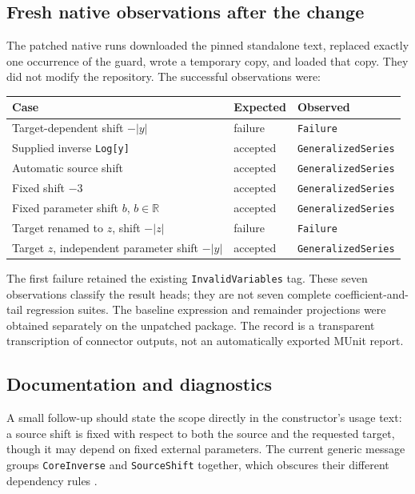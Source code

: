 \documentclass[11pt,letterpaper]{article}
\newcommand{\code}[1]{\texttt{#1}}
\newcommand{\R}{\mathbb R}
\begin{document}
\subsection{Fresh native observations after the change}
The patched native runs downloaded the pinned standalone text, replaced exactly one occurrence of the guard, wrote a temporary copy, and loaded that copy. They did not modify the repository. The successful observations were:
\begin{center}
\begin{tabularx}{\textwidth}{@{}Xll@{}}
\toprule
Case & Expected & Observed\\
\midrule
Target-dependent shift $-\lvert y\rvert$ & failure & \code{Failure}\\
Supplied inverse \code{Log[y]} & accepted & \code{GeneralizedSeries}\\
Automatic source shift & accepted & \code{GeneralizedSeries}\\
Fixed shift $-3$ & accepted & \code{GeneralizedSeries}\\
Fixed parameter shift $b$, $b\in\R$ & accepted & \code{GeneralizedSeries}\\
Target renamed to $z$, shift $-\lvert z\rvert$ & failure & \code{Failure}\\
Target $z$, independent parameter shift $-\lvert y\rvert$ & accepted & \code{GeneralizedSeries}\\
\bottomrule
\end{tabularx}
\end{center}
The first failure retained the existing \code{InvalidVariables} tag. These seven observations classify the result heads; they are not seven complete coefficient-and-tail regression suites. The baseline expression and remainder projections were obtained separately on the unpatched package. The record is a transparent transcription of connector outputs, not an automatically exported MUnit report.

\subsection{Documentation and diagnostics}
A small follow-up should state the scope directly in the constructor's usage text: a source shift is fixed with respect to both the source and the requested target, though it may depend on fixed external parameters. The current generic message groups \code{CoreInverse} and \code{SourceShift} together, which obscures their different dependency rules \cite{expcore}.
\end{document}
